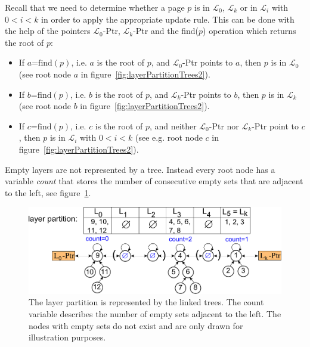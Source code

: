 \documentclass[a4paper,12pt, titlepage]{article}  %
\newcommand{\cl}{\mathcal{L}}   %
\begin{document}
Recall that we need to determine whether a page $p$ is in $\cl_0$, $\cl_k$ or in $\cl_i$ with $0<i<k$
in order to apply the appropriate update rule. This can be done with the help of the pointers 
$\cl_0$-Ptr, $\cl_k$-Ptr and the find($p$) operation which returns the root of $p$: 
\begin{itemize}
 \item If $a$=$\text{find}(p)$, i.e. $a$ is the root of $p$, 
       and $\cl_0$-Ptr points to $a$, then $p$ is in $\cl_0$ (see root node $a$ 
       in figure~\ref{fig:layerPartitionTrees2}).
 
 \item If $b$=$\text{find}(p)$, i.e. $b$ is the root of $p$, and $\cl_k$-Ptr points to $b$, then $p$ is in $\cl_k$ (see
 	root node $b$ in figure~\ref{fig:layerPartitionTrees2}).
 
 \item If $c$=$\text{find}(p)$, i.e. $c$ is the root of $p$, and neither $\cl_0$-Ptr nor $\cl_k$-Ptr point to $c$, then
       $p$ is in $\cl_i$ with $0<i<k$ (see e.g. root node $c$ in figure~\ref{fig:layerPartitionTrees2}). 
\end{itemize}

\noindent Empty layers are not represented by a tree. Instead every root node has a variable \emph{count} that 
stores the number of consecutive empty sets that are adjacent to the left, see 
figure~\ref{fig:LTrees_countVariable}.

\begin{figure}[ht]
	\centering
	\includegraphics[scale=0.43]{./figures/LTrees_countVariable_small.pdf}
	\caption{The layer partition is represented by the linked trees. The count variable describes 
	         the number of empty sets adjacent to the left. The nodes with empty sets do not exist and 
	         are only drawn for illustration purposes.}
	\label{fig:LTrees_countVariable}
\end{figure}
\end{document}
